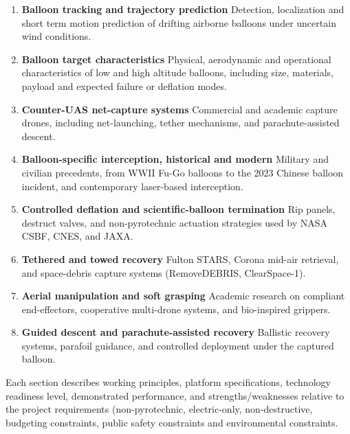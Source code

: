 \begin{enumerate}
        
    \item \textbf{Balloon tracking and trajectory prediction}  Detection, localization and short term motion prediction of drifting airborne balloons under uncertain wind conditions. 

    \item \textbf{Balloon target characteristics}  Physical, aerodynamic and operational characteristics of low and high altitude balloons, including size, materials, payload and expected failure or deflation modes. 


	\item \textbf{Counter-UAS net-capture systems}  Commercial and academic capture drones, including net-launching, tether mechanisms, and parachute-assisted descent.
	
	\item \textbf{Balloon-specific interception, historical and modern}  Military and civilian precedents, from WWII Fu-Go balloons to the 2023 Chinese balloon incident, and contemporary laser-based interception.
	
	\item \textbf{Controlled deflation and scientific-balloon termination}  Rip panels, destruct valves, and non-pyrotechnic actuation strategies used by NASA CSBF, CNES, and JAXA.
	
	\item \textbf{Tethered and towed recovery}  Fulton STARS, Corona mid-air retrieval, and space-debris capture systems (RemoveDEBRIS, ClearSpace-1).
	
	\item \textbf{Aerial manipulation and soft grasping}  Academic research on compliant end-effectors, cooperative multi-drone systems, and bio-inspired grippers.
	
	\item \textbf{Guided descent and parachute-assisted recovery}  Ballistic recovery systems, parafoil guidance, and controlled deployment under the captured balloon.


\end{enumerate}

Each section describes working principles, platform specifications, technology readiness level, demonstrated performance, and strengths/weaknesses relative to the project requirements (non-pyrotechnic, electric-only, non-destructive, budgeting constraints, public safety constraints and environmental constraints.



